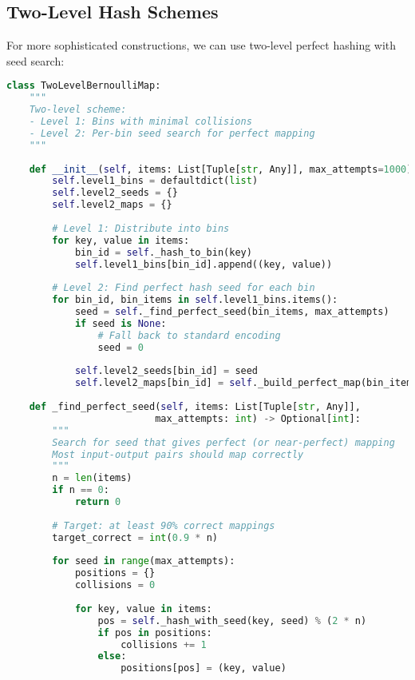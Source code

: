 \subsection{Two-Level Hash Schemes}

For more sophisticated constructions, we can use two-level perfect hashing with seed search:

\begin{lstlisting}[language=Python, caption={Two-level perfect hashing for Bernoulli maps}]
class TwoLevelBernoulliMap:
    """
    Two-level scheme:
    - Level 1: Bins with minimal collisions
    - Level 2: Per-bin seed search for perfect mapping
    """
    
    def __init__(self, items: List[Tuple[str, Any]], max_attempts=1000):
        self.level1_bins = defaultdict(list)
        self.level2_seeds = {}
        self.level2_maps = {}
        
        # Level 1: Distribute into bins
        for key, value in items:
            bin_id = self._hash_to_bin(key)
            self.level1_bins[bin_id].append((key, value))
        
        # Level 2: Find perfect hash seed for each bin
        for bin_id, bin_items in self.level1_bins.items():
            seed = self._find_perfect_seed(bin_items, max_attempts)
            if seed is None:
                # Fall back to standard encoding
                seed = 0
            
            self.level2_seeds[bin_id] = seed
            self.level2_maps[bin_id] = self._build_perfect_map(bin_items, seed)
    
    def _find_perfect_seed(self, items: List[Tuple[str, Any]], 
                          max_attempts: int) -> Optional[int]:
        """
        Search for seed that gives perfect (or near-perfect) mapping
        Most input-output pairs should map correctly
        """
        n = len(items)
        if n == 0:
            return 0
        
        # Target: at least 90% correct mappings
        target_correct = int(0.9 * n)
        
        for seed in range(max_attempts):
            positions = {}
            collisions = 0
            
            for key, value in items:
                pos = self._hash_with_seed(key, seed) % (2 * n)
                if pos in positions:
                    collisions += 1
                else:
                    positions[pos] = (key, value)
            

\end{lstlisting}
